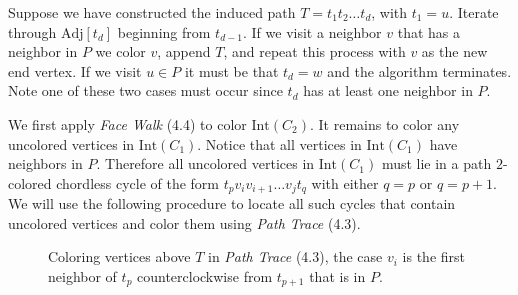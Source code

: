 \documentclass[letterpaper, 12pt]{amsart}
\theoremstyle{definition}
\theoremstyle{definition}
\theoremstyle{thm}
\theoremstyle{definition}
\begin{document}
Suppose we have constructed the induced path $T=t_1t_2\ldots t_d$, with $t_1=u$.
Iterate through $\text{Adj}[t_d]$
beginning from $t_{d-1}$. If we visit a neighbor $v$ that has a neighbor in
$P$ we color $v$, append $T$, and repeat this process with $v$ as the new
end vertex. If we visit $u\in P$ it must be that $t_d=w$ and
the algorithm terminates. Note one of these two cases must occur since $t_d$
has at least one neighbor in $P$.

We first apply \textit{Face Walk} (4.4) to color $\text{Int}(C_2)$. It remains
to color any uncolored vertices in $\text{Int}(C_1)$. Notice that all vertices
in $\text{Int}(C_1)$ have neighbors in $P$. Therefore all uncolored
vertices in $\text{Int}(C_1)$ must lie in a path $2$-colored chordless cycle of
the form $t_pv_iv_{i+1}\ldots v_jt_q$ with either $q=p$ or $q=p+1$. We will use
the following procedure to locate all such cycles that contain uncolored
vertices and color them using \textit{Path Trace} (4.3).

\begin{figure}

\caption{Coloring vertices above $T$ in \textit{Path Trace} (4.3), the case
$v_i$ is the first neighbor of $t_p$ counterclockwise from $t_{p+1}$ that is in
$P$.}
\end{figure}
\end{document}
